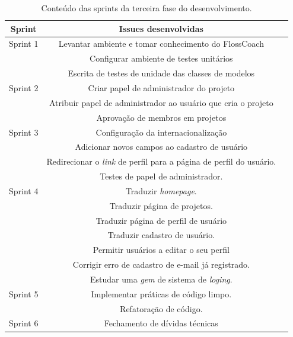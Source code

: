 \begin{table}[h]
	\centering
	\begin{tabular}{ccc}
		\toprule
		\textbf{Sprint} & \textbf{Issues desenvolvidas} \\
		\midrule
		Sprint 1 & Levantar ambiente e tomar conhecimento do FlossCoach \\
			 & Configurar ambiente de testes unitários \\
			 & Escrita de testes de unidade das classes de modelos\\
		\midrule
		Sprint 2 & Criar papel de administrador do projeto\\
			 & Atribuir papel de administrador ao usuário que cria o projeto \\
			 & Aprovação de membros em projetos \\
		\midrule		
		Sprint 3 & Configuração da internacionalização \\
			 & Adicionar novos campos ao cadastro de usuário\\
			 & Redirecionar o \textit{link} de perfil para a página de perfil do usuário.\\
			 & Testes de papel de administrador.\\
		\midrule		
		Sprint 4 & Traduzir \textit{homepage}.\\
			 & Traduzir página de projetos.\\
			 & Traduzir página de perfil de usuário\\
			 & Traduzir cadastro de usuário.\\ 
			 & Permitir usuários a editar o seu perfil\\
			 & Corrigir erro de cadastro de e-mail já registrado.\\
			 & Estudar uma \textit{gem} de sistema de \textit{loging}.\\  
		\midrule		
		Sprint 5 & Implementar práticas de código limpo.\\
			 & Refatoração de código.\\
	
		\midrule
		Sprint 6 & Fechamento de dívidas técnicas\\
		\bottomrule
	\end{tabular}

	\caption{Conteúdo das sprints da terceira fase do desenvolvimento.}
	\label{issues}
\end{table}

